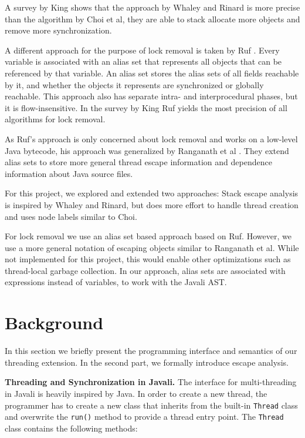 \documentclass[letterpaper]{article}
\newcommand{\mypar}[1]{{\bf #1.}}
\begin{document}
A survey by King \cite{King:04} shows that the approach by Whaley and Rinard is more precise
than the algorithm by Choi et al, they are able to stack allocate more objects and
remove more synchronization.

A different approach for the purpose of lock removal is taken by Ruf \cite{Ruf:00}.
Every variable is associated with an alias set that represents all objects that
can be referenced by that variable. An alias set stores the alias sets of all
fields reachable by it, and whether the objects it represents are synchronized
or globally reachable. This approach also has separate intra- and interprocedural
phases, but it is flow-insensitive. In the survey by  King \cite{King:04} Ruf
yields the most precision of all algorithms for lock removal.

As Ruf's approach is only concerned about lock removal and works on a low-level
Java bytecode, his approach was generalized by Ranganath et al \cite{Ranganath:04}.
They extend alias sets to store more general thread escape information
and dependence information about Java source files.

For this project, we explored and extended two approaches: Stack escape analysis
is inspired by Whaley and Rinard, but does more effort to handle thread creation
and uses node labels similar to Choi.

For lock removal we use an alias set based approach based on Ruf. However, we
use a more general notation of escaping objects similar to Ranganath et al. While
not implemented for this project, this would enable other optimizations such
as thread-local garbage collection. In our approach, alias sets are associated
with expressions instead of variables, to work with the Javali AST.


\section{Background}\label{sec:background}

In this section we briefly present the programming interface and semantics of our
threading extension. In the second part, we formally introduce escape analysis.

\mypar{Threading and Synchronization in Javali}
The interface for multi-threading in Javali is heavily inspired by Java. In
order to create a new thread, the programmer has to create a new class that
inherits from the built-in \texttt{Thread} class and overwrite the \texttt{run()}
method to provide a thread entry point. 
The \texttt{Thread} class contains the following methods:
\end{document}
